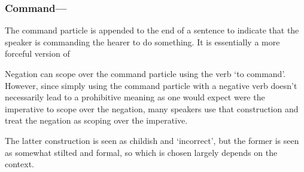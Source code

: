 \documentclass[a4paper,11pt,oneside,openany]{memoir}
\begin{document}
\subsubsection{Command---}

The command particle 
is appended to the end of a sentence to indicate that the speaker is commanding the hearer to do something. It is essentially a more forceful version of 






Negation can scope over the command particle using the verb 
`to command'. However, since simply using the command particle with a negative verb doesn't necessarily lead to a prohibitive meaning as one would expect were the imperative to scope over the negation, many speakers use that construction and treat the negation as scoping over the imperative.


The latter construction is seen as childish and `incorrect', but the former is seen as somewhat stilted and formal, so which is chosen largely depends on the context.
\end{document}

